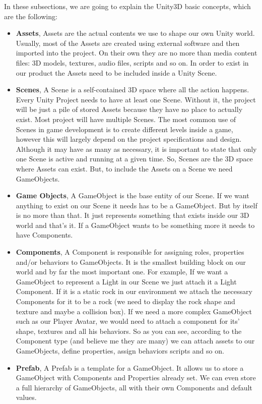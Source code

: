 In these subsections, we are going to explain the Unity3D basic concepts, which are the following:

\begin{itemize}
\item \textbf{Assets}, Assets are the actual contents we use to shape our own Unity world. Usually, most of the Assets are created using external software and then imported into the project.
On their own they are no more than media content files: 3D models, textures, audio files, scripts and so on. 
In order to exist in our product the Assets need to be included inside a Unity Scene.
\item \textbf{Scenes}, A Scene is a self-contained 3D space where all the action happens. Every Unity Project needs to have at least one Scene. Without it, the project will be just a pile of stored Assets because they have no place to actually exist.
Most project will have multiple Scenes. The most common use of Scenes in game development is to create different levels inside a game, however this will largely depend on the project specifications and design. Although it may have as many as necessary, it is important to state that only one Scene is active and running at a given time.
So, Scenes are the 3D space where Assets can exist. But, to include the Assets on a Scene we need GameObjects.
\item \textbf{Game Objects}, A GameObject is the base entity of our Scene. If we want anything to exist on our Scene it needs has to be a GameObject. But by itself is no more than that. It just represents something that exists inside our 3D world and that’s it.
If a GameObject wants to be something more it needs to have Components.
\item \textbf{Components}, A Component is responsible for assigning roles, properties and/or behaviors to GameObjects. It is the smallest building block on our world and by far the most important one.
For example, If we want a GameObject to represent a Light in our Scene we just attach it a Light Component. If it is a static rock in our environment we attach the necessary Components for it to be a rock (we need to display the rock shape and texture and maybe a collision box). If we need a more complex GameObject such as our Player Avatar, we would need to attach a component for its’ shape, textures and all his behaviors.
So as you can see, according to the Component type (and believe me they are many) we can attach assets to our GameObjects, define properties, assign behaviors scripts and so on.
\item \textbf{Prefab}, A Prefab is a template for a GameObject. It allows us to store a GameObject with Components and Properties already set. We can even store a full hierarchy of GameObjects, all with their own Components and default values. 
\end{itemize}

